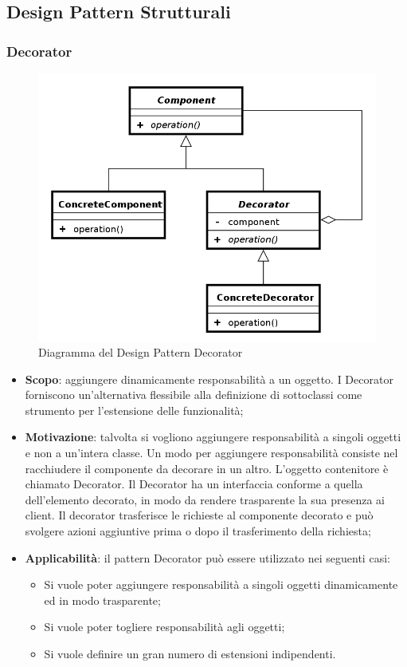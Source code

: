 	\subsection{Design Pattern Strutturali}

		\subsubsection{Decorator}
		\begin{figure}[H]
		\centering
		\includegraphics[width=0.5\linewidth]{GraficiAppendici/decorator.png}
		\caption{Diagramma del Design Pattern Decorator}
	\end{figure}
	\begin{itemize}
	\item \textbf{Scopo}: aggiungere dinamicamente responsabilità a un oggetto. I Decorator forniscono
un’alternativa flessibile alla definizione di sottoclassi come strumento per l’estensione delle funzionalità;
	\item \textbf{Motivazione}: talvolta si vogliono aggiungere responsabilità a singoli oggetti e
non a un’intera classe. Un modo per aggiungere responsabilità consiste nel racchiudere il componente da
decorare in un altro. L’oggetto contenitore è chiamato Decorator. Il Decorator ha un interfaccia conforme a quella dell’elemento decorato, in modo da rendere trasparente la sua presenza ai client. Il decorator trasferisce le richieste al componente decorato e può svolgere azioni aggiuntive prima o dopo il trasferimento della richiesta;
	\item \textbf{Applicabilità}: il pattern Decorator può essere utilizzato nei seguenti casi:
	\begin{itemize}
	\item Si vuole poter aggiungere responsabilità a singoli oggetti dinamicamente ed in modo trasparente;
	\item Si vuole poter togliere responsabilità agli oggetti;
	\item Si vuole definire un gran numero di estensioni indipendenti.
	\end{itemize}
\end{itemize}			
		
